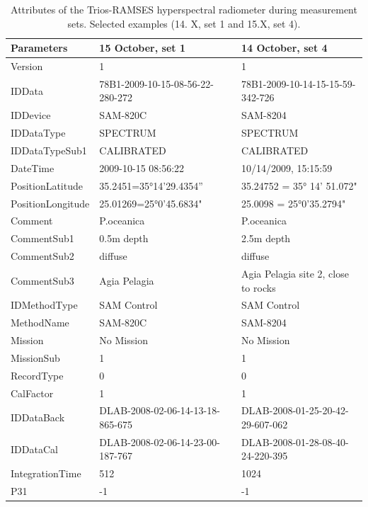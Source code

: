 \documentclass[10pt, a4paper]{article}
\begin{document}
\begin{appendices}
\begin{table}[H]
\caption{Attributes of the Trios-RAMSES hyperspectral radiometer during measurement sets. Selected examples (14. X, set 1 and 15.X, set 4).}
\label{tab:18}
\centering
{}
  \begin{tabular}{| p{3cm} | p{3cm} | p{5cm} |}
    \hline
    \textbf{Parameters} & \textbf{15 October, set 1} & \textbf{14 October, set 4} \\ \hline \hline
     Version &1 & 1 \\ \hline
     IDData & 78B1-2009-10-15-08-56-22-280-272 & 78B1-2009-10-14-15-15-59-342-726 \\ \hline
     IDDevice & SAM-820C & SAM-8204\\ \hline
     IDDataType & SPECTRUM & SPECTRUM \\ \hline
     IDDataTypeSub1 & CALIBRATED & CALIBRATED \\ \hline
      DateTime & 2009-10-15 08:56:22 & 10/14/2009, 15:15:59 \\ \hline
     PositionLatitude & 35.2451=35°14'29.4354” & 35.24752 = 35° 14' 51.072" \\ \hline
     PositionLongitude & 25.01269=25°0'45.6834" & 25.0098 = 25°0'35.2794" \\ \hline
     Comment & P.oceanica & P.oceanica \\ \hline
     CommentSub1 & 0.5m depth & 2.5m depth \\ \hline
     CommentSub2 & diffuse & diffuse \\ \hline
     CommentSub3 & Agia Pelagia & Agia Pelagia site 2, close to rocks \\ \hline
     IDMethodType & SAM Control & SAM Control \\ \hline
    MethodName & SAM-820C & SAM-8204 \\ \hline
    Mission & No Mission & No Mission \\ \hline
    MissionSub & 1 & 1 \\ \hline
    RecordType & 0 & 0 \\ \hline
    CalFactor & 1 & 1 \\ \hline
   IDDataBack & DLAB-2008-02-06-14-13-18-865-675 & DLAB-2008-01-25-20-42-29-607-062 \\ \hline
   IDDataCal & DLAB-2008-02-06-14-23-00-187-767 & DLAB-2008-01-28-08-40-24-220-395 \\ \hline
   IntegrationTime & 512 & 1024 \\ \hline
    P31 & -1 & -1 \\ \hline

\end{tabular}
\end{table}
\end{appendices}
\end{document}
